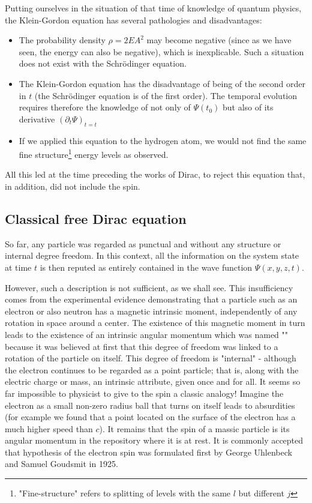 	Putting ourselves in the situation of that time of knowledge of quantum physics, the Klein-Gordon equation has several pathologies and disadvantages:
	\begin{itemize}
		\item The probability density $\rho=2EA^2$ may become negative (since as we have seen, the energy can also be negative), which is inexplicable. Such a situation does not exist with the Schrödinger equation.
		
		\item The Klein-Gordon equation has the disadvantage of being of the second order in $t$ (the Schrödinger equation is of the first order). The temporal evolution requires therefore the knowledge of not only of $\Psi(t_0)$ but also of its derivative $(\partial_t \Psi)_{t=t}$

		\item If we applied this equation to the hydrogen atom, we would not find the same fine structure\footnote{"Fine-structure" refers to splitting of levels with the same $l$ but different $j$} energy levels as observed.		
	\end{itemize}
	All this led at the time preceding the works of Dirac, to reject this equation that, in addition, did not include the spin.

	\pagebreak	
	\subsection{Classical free Dirac equation}\label{classical free dirac equation}
	So far, any particle was regarded as punctual and without any structure or internal degree freedom. In this context, all the information on the system state at time $t$ is then reputed as entirely contained in the wave function $\Psi(x,y,z,t)$.

	However, such a description is not sufficient, as we shall see. This insufficiency comes from the experimental evidence demonstrating that a particle such as an electron or also neutron has a magnetic intrinsic moment, independently of any rotation in space around a center. The existence of this magnetic moment in turn leads to the existence of an intrinsic angular momentum which was named "" because it was believed at first that this degree of freedom was linked to a rotation of the particle on itself. This degree of freedom is "internal" - although the electron continues to be regarded as a point particle; that is, along with the electric charge or mass, an intrinsic attribute, given once and for all. It seems so far impossible to physicist to give to the spin a classic analogy! Imagine the electron as a small non-zero radius ball that turns on itself leads to absurdities (for example we found that a point located on the surface of the electron has a much higher speed than $c$). It remains that the spin of a massic particle is its angular momentum in the repository where it is at rest. It is commonly accepted that hypothesis of the electron spin was formulated first by George Uhlenbeck and Samuel Goudsmit in 1925.

